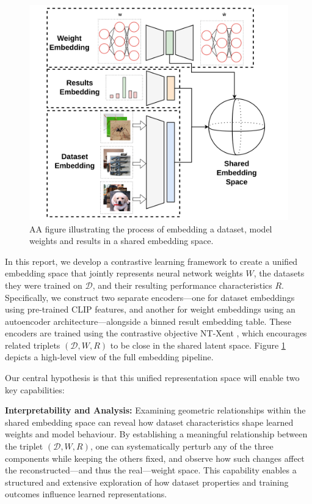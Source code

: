 \begin{figure}[!t]
    \centering
    \includegraphics[width=0.75\linewidth]{pipeline.png}
    \caption[A figure illustrating the process of embedding a dataset, model weigths and results into a shared embedding space ]{AA figure illustrating the process of embedding a dataset, model weights and results in a shared embedding space. }
    \label{fig:pipeline}
\end{figure}

In this report, we develop a contrastive learning framework to create a unified embedding space that jointly represents neural network weights \( W \), the datasets they were trained on \( \mathcal{D} \), and their resulting performance characteristics \( R \). Specifically, we construct two separate encoders—one for dataset embeddings using pre-trained CLIP features, and another for weight embeddings using an autoencoder architecture—alongside a binned result embedding table. These encoders are trained using the contrastive objective NT-Xent \cite{agren2022ntxentlossupperbound}, which encourages related triplets \( (\mathcal{D}, W, R) \) to be close in the shared latent space. Figure \ref{fig:pipeline} depicts a high-level view of the full embedding pipeline.



Our central hypothesis is that this unified representation space will enable two key capabilities:

\textbf{Interpretability and Analysis:} Examining geometric relationships within the shared embedding space can reveal how dataset characteristics shape learned weights and model behaviour. By establishing a meaningful relationship between the triplet \( (\mathcal{D}, W, R) \), one can systematically perturb any of the three components while keeping the others fixed, and observe how such changes affect the reconstructed---and thus the real---weight space. This capability enables a structured and extensive exploration of how dataset properties and training outcomes influence learned representations.

